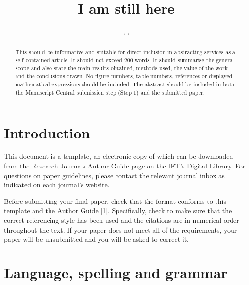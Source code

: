 \documentclass{cta-author}
\begin{document}

\title{I am still here}

\author{, , }

\address{
}

\begin{abstract}
This should be informative and suitable for direct
inclusion in abstracting services as a self-contained
article. It should not exceed 200 words. It should
summarise the general scope and also state the main results
obtained, methods used, the value of the work and the
conclusions drawn. No figure numbers, table numbers,
references or displayed mathematical expressions should be
included. The abstract should be included in both the
Manuscript Central submission step (Step 1) and the
submitted paper.
\end{abstract}

\maketitle

\section{Introduction}\label{sec1}

This document is a template, an electronic copy of which
can be downloaded from the Research Journals Author Guide
page on the IET's Digital Library. For questions on paper
guidelines, please contact the relevant journal inbox as
indicated on each journal's website.

Before submitting your final paper, check that the format
conforms to this template and the Author Guide [1].
Specifically, check to make sure that the correct
referencing style has been used and the citations are in
numerical order throughout the text. If your paper does not
meet all of the requirements, your paper will be
unsubmitted and you will be asked to correct it.

\section{Language, spelling and grammar}\label{sec2}
\end{document}
